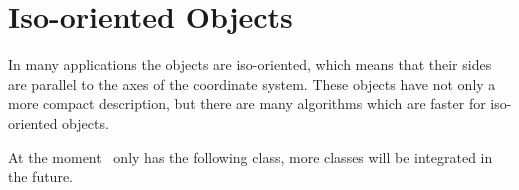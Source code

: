 
\cleardoublepage
\chapter{Iso-oriented Objects}\label{IsoObjects}

In many applications the objects are iso-oriented, which means that their
sides are parallel to the axes of the coordinate system. These objects
have not only a more compact description, but there are many algorithms
which are faster for iso-oriented objects. 

At the moment \cgal\ only has the following class, more classes 
will be integrated in the future.




